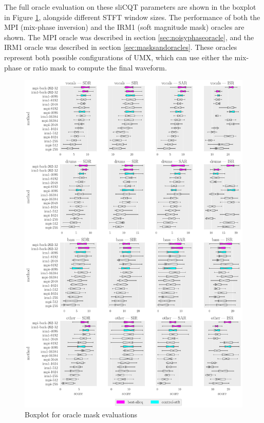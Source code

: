 \documentclass[report.tex]{subfiles}
\begin{document}
The full oracle evaluation on these sliCQT parameters are shown in the boxplot in Figure \ref{fig:oraclebssboxplot}, alongside different STFT window sizes. The performance of both the MPI (mix-phase inversion) and the IRM1 (soft magnitude mask) oracles are shown. The MPI oracle was described in section \ref{sec:noisyphaseoracle}, and the IRM1 oracle was described in section \ref{sec:masksandoracles}. These oracles represent both possible configurations of UMX, which can use either the mix-phase or ratio mask to compute the final waveform.

\begin{figure}[ht]
	\centering
	\includegraphics[width=\textwidth]{./images-bss/oracle_boxplot.pdf}
	\caption{Boxplot for oracle mask evaluations}
	\label{fig:oraclebssboxplot}
\end{figure}
\end{document}
